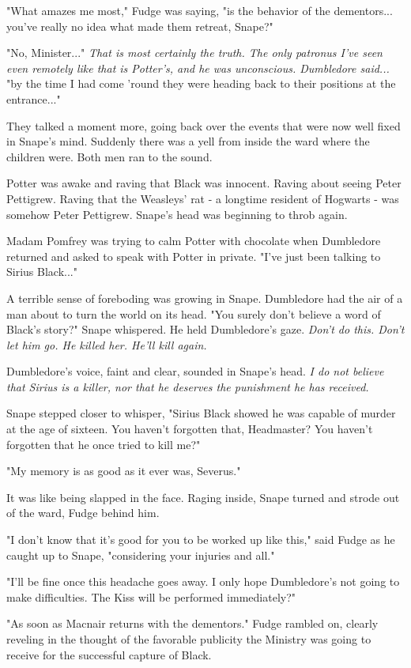\documentclass[a4paper,11pt]{article}
\begin{document}
"What amazes me most," Fudge was saying, "is the behavior of the dementors... you've really no idea what made them retreat, Snape?"

"No, Minister..." \emph{That is most certainly the truth. The only patronus I've seen even remotely like that is Potter's, and he was unconscious. Dumbledore said...} "by the time I had come 'round they were heading back to their positions at the entrance..."

They talked a moment more, going back over the events that were now well fixed in Snape's mind. Suddenly there was a yell from inside the ward where the children were. Both men ran to the sound.

Potter was awake and raving that Black was innocent. Raving about seeing Peter Pettigrew. Raving that the Weasleys' rat - a longtime resident of Hogwarts - was somehow Peter Pettigrew. Snape's head was beginning to throb again.

Madam Pomfrey was trying to calm Potter with chocolate when Dumbledore returned and asked to speak with Potter in private. "I've just been talking to Sirius Black..."

A terrible sense of foreboding was growing in Snape. Dumbledore had the air of a man about to turn the world on its head. "You surely don't believe a word of Black's story?" Snape whispered. He held Dumbledore's gaze. \emph{Don't do this. Don't let him go. He killed her. He'll kill again.}

Dumbledore's voice, faint and clear, sounded in Snape's head. \emph{I do not believe that Sirius is a killer, nor that he deserves the punishment he has received.}

Snape stepped closer to whisper, "Sirius Black showed he was capable of murder at the age of sixteen. You haven't forgotten that, Headmaster? You haven't forgotten that he once tried to kill me?"

"My memory is as good as it ever was, Severus."

It was like being slapped in the face. Raging inside, Snape turned and strode out of the ward, Fudge behind him.

"I don't know that it's good for you to be worked up like this," said Fudge as he caught up to Snape, "considering your injuries and all."

"I'll be fine once this headache goes away. I only hope Dumbledore's not going to make difficulties. The Kiss will be performed immediately?"

"As soon as Macnair returns with the dementors." Fudge rambled on, clearly reveling in the thought of the favorable publicity the Ministry was going to receive for the successful capture of Black.
\end{document}
